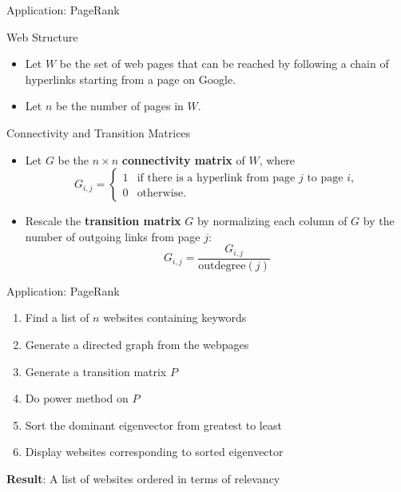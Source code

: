 \documentclass[10pt]{beamer}
\begin{document}
\begin{frame}{Application: PageRank}
    \begin{block}{Web Structure}
        \begin{itemize}
            \item Let $W$ be the set of web pages that can be reached by following a chain of hyperlinks starting from a page on Google.
            \item Let $n$ be the number of pages in $W$.
        \end{itemize}
    \end{block}
    
    \vspace{2mm}
    
    \begin{block}{Connectivity and Transition Matrices}
        \begin{itemize}
            \item Let $G$ be the $n \times n$ \textbf{connectivity matrix} of $W$, where
            \[
            G_{i,j} = 
            \begin{cases}
                1 & \text{if there is a hyperlink from page } j \text{ to page } i, \\
                0 & \text{otherwise}.
            \end{cases}
            \]
            \item Rescale the \textbf{transition matrix} $G$ by normalizing each column of $G$ by the number of outgoing links from page $j$:
            \[
            G_{i,j} = \frac{G_{i,j}}{\text{outdegree}(j)}
            \]
        \end{itemize}
    \end{block}
\end{frame}
\begin{frame}{Application: PageRank}

\begin{enumerate}
    \item Find a list of $n$ websites containing keywords
    \item Generate a directed graph from the webpages 
    \item Generate a transition matrix $P$
    \item Do power method on $P$
    \item Sort the dominant eigenvector from greatest to least 
    \item Display websites corresponding to sorted eigenvector
\end{enumerate}

\textbf{Result}: A list of websites ordered in terms of relevancy
\end{frame}

\end{document}
